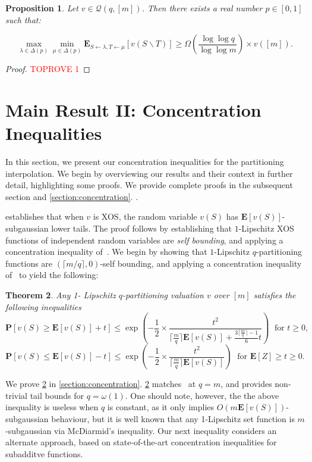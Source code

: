 \documentclass[11pt]{article}%
\newtheorem{theorem}{Theorem}
\newtheorem{proposition}[theorem]{Proposition}
\numberwithin{theorem}{subsection}
\newcommand{\prob}{\mathbf{P}}
\newcommand{\expect}{\mathbf{E}}
\begin{document}
\begin{proposition}\label{prop:qpartprobexists} Let $v \in \mathcal{Q}(q,[m])$. Then there exists a real number $p\in [0,1]$ such that:

$$\max_{\lambda\in \Delta(p)}
\min_{\mu \in \Delta(p)}\expect_{S\leftarrow \lambda, T\leftarrow \mu}[v(S\backslash T)]\ge
\Omega \left(\frac{\log \log q}{\log \log m}\right)\times v([m]).$$
\end{proposition}

\begin{proof}\textcolor{red}{TOPROVE 1}\end{proof}

\section{Main Result II: Concentration Inequalities}
\label{section:introconcentration}

In this section, we present our concentration inequalities for the partitioning interpolation. We begin by overviewing our results and their context in further detail, highlighting some proofs. We provide complete proofs in the subsequent section and 
\cref{section:concentration}.
.

\cite{Vondrak10} establishes that when $v$ is XOS, the random variable $v(S)$ has $\expect[v(S)]$-subgaussian lower tails. The proof follows by establishing that $1$-Lipschitz XOS functions of independent random variables are \emph{self bounding}, and applying a concentration inequality of~\cite{BoucheronLM00}. We begin by showing that $1$-Lipschitz $q$-partitioning functions are $(\lceil m/q\rceil,0)$-self bounding, and applying a concentration inequality of~\cite{McDiarmidR06,BoucheronLM09} to yield the following:

\begin{theorem}
\label{thm:selfboundingqpart}
Any 1- Lipschitz $q$-partitioning valuation $v$ over $[m]$ satisfies the following inequalities
$$
\prob\left[v(S)\ge \expect[v(S)] + t\right]\le
\exp\left(-\frac{1}{2}\times\frac{t^2}{\lceil\frac{m}{q}\rceil \expect[v(S)] + \frac{3\lceil \frac{m}{q}\rceil-1}{6}t}\right)\;\text { for }t\ge 0,
$$
$$
\prob[v(S)\le \expect[v(S)] - t]\le
\exp\left(-\frac{1}{2}\times\frac{t^2}{\lceil\frac{m}{q}\rceil \expect[v(S)]}\right)\;\text{ for }\expect[Z]\ge t\ge 0.
$$
\end{theorem}

We prove \cref{thm:selfboundingqpart} in \cref{section:concentration}. \cref{thm:selfboundingqpart} matches~\cite{Vondrak10} at $q=m$, and provides non-trivial tail bounds for $q = \omega(1)$. One should note, however, the the above inequality is useless when $q$ is constant, as it only implies $O(m\expect[v(S)])$-subgaussian behaviour, but it is well known that any 1-Lipschitz set function is $m$-subgaussian via McDiarmid's inequality. Our next inequality considers an alternate approach, based on state-of-the-art concentration inequalities for subadditve functions.\\
\end{document}
